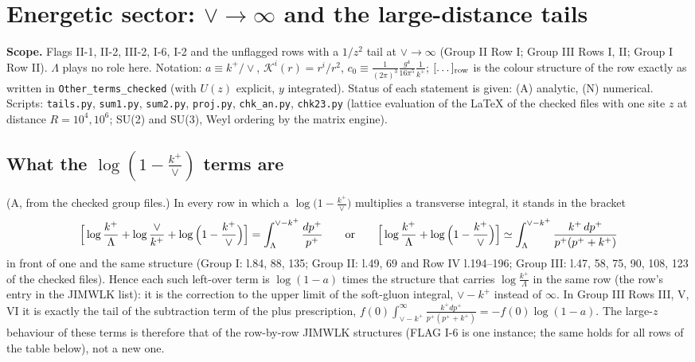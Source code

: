 \documentclass[9pt]{article}
\numberwithin{equation}{section}
\begin{document}
\section{Energetic sector: $\vee\to\infty$ and the large-distance tails}
\noindent\textbf{Scope.} Flags II-1, II-2, III-2, I-6, I-2 and the unflagged rows with a $1/z^{2}$ tail at $\vee\to\infty$ (Group II Row I; Group III Rows I, II; Group I Row II). $\Lambda$ plays no role here. Notation: $a\equiv k^{+}/\vee$, $\mathcal K^{i}(r)=r^{i}/r^{2}$, $c_{0}\equiv\frac{1}{(2\pi)^{3}}\frac{g^{4}}{16\pi^{5}}\frac{1}{k^{+}}$; $[\dots]_{\rm row}$ is the colour structure of the row exactly as written in \texttt{Other\_terms\_checked} (with $U(z)$ explicit, $y$ integrated). Status of each statement is given: (A) analytic, (N) numerical. Scripts: \texttt{tails.py}, \texttt{sum1.py}, \texttt{sum2.py}, \texttt{proj.py}, \texttt{chk\_an.py}, \texttt{chk23.py} (lattice evaluation of the LaTeX of the checked files with one site $z$ at distance $R=10^{4},10^{6}$; SU(2) and SU(3), Weyl ordering by the matrix engine).

\subsection{What the $\log(1-\frac{k^{+}}{\vee})$ terms are}
\noindent (A, from the checked group files.) In every row in which a $\log\big(1-\frac{k^{+}}{\vee}\big)$ multiplies a transverse integral, it stands in the bracket
\begin{align}
\Big[\log\frac{k^{+}}{\Lambda}+\log\frac{\vee}{k^{+}}+\log\Big(1-\frac{k^{+}}{\vee}\Big)\Big]=\int_{\Lambda}^{\vee-k^{+}}\frac{dp^{+}}{p^{+}}
\qquad\text{or}\qquad
\Big[\log\frac{k^{+}}{\Lambda}+\log\Big(1-\frac{k^{+}}{\vee}\Big)\Big]\simeq\int_{\Lambda}^{\vee-k^{+}}\frac{k^{+}\,dp^{+}}{p^{+}(p^{+}+k^{+})}\notag
\end{align}
in front of one and the same structure (Group I: l.84, 88, 135; Group II: l.49, 69 and Row IV l.194--196; Group III: l.47, 58, 75, 90, 108, 123 of the checked files). Hence each such left-over term is $\log(1-a)$ times the structure that carries $\log\frac{k^{+}}{\Lambda}$ in the same row (the row's entry in the JIMWLK list): it is the correction to the upper limit of the soft-gluon integral, $\vee-k^{+}$ instead of $\infty$. In Group III Rows III, V, VI it is exactly the tail of the subtraction term of the plus prescription, $f(0)\int_{\vee-k^{+}}^{\infty}\frac{k^{+}dp^{+}}{p^{+}(p^{+}+k^{+})}=-f(0)\log(1-a)$. The large-$z$ behaviour of these terms is therefore that of the row-by-row JIMWLK structures (FLAG I-6 is one instance; the same holds for all rows of the table below), not a new one.
\end{document}
